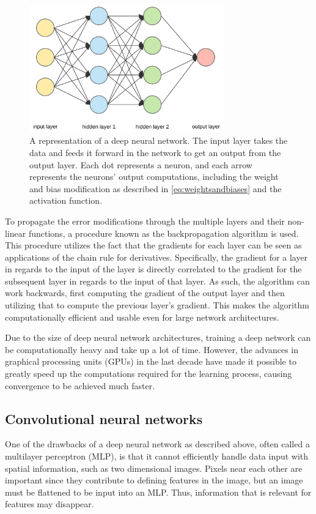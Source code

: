\documentclass{kththesis}
\begin{document}
\begin{figure}
\centering
\includegraphics[width=0.75\textwidth]{dnn.png}
\caption{A representation of a deep neural network. The input layer takes the data and feeds it forward in the network to get an output from the output layer. Each dot represents a neuron, and each arrow represents the neurons' output computations, including the weight and bias modification as described in \autoref{eq:weightsandbiases} and the activation function.}
\label{fig:dnn}
\end{figure}

To propagate the error modifications through the multiple layers and their non-linear functions, a procedure known as the backpropagation algorithm is used. This procedure utilizes the fact that the gradients for each layer can be seen as applications of the chain rule for derivatives. Specifically, the gradient for a layer in regards to the input of the layer is directly correlated to the gradient for the subsequent layer in regards to the input of that layer. As such, the algorithm can work backwards, first computing the gradient of the output layer and then utilizing that to compute the previous layer's gradient. This makes the algorithm computationally efficient and usable even for large network architectures. \parencite{Goodfellow-et-al-2016} 

Due to the size of deep neural network architectures, training a deep network can be computationally heavy and take up a lot of time. However, the advances in graphical processing units (GPUs) in the last decade have made it possible to greatly speed up the computations required for the learning process, causing convergence to be achieved much faster. \parencite{lecun2015deep}

\subsection{Convolutional neural networks}
One of the drawbacks of a deep neural network as described above, often called a multilayer perceptron (MLP), is that it cannot efficiently handle data input with spatial information, such as two dimensional images. Pixels near each other are important since they contribute to defining features in the image, but an image must be flattened to be input into an MLP. Thus, information that is relevant for features may disappear. 
\end{document}
